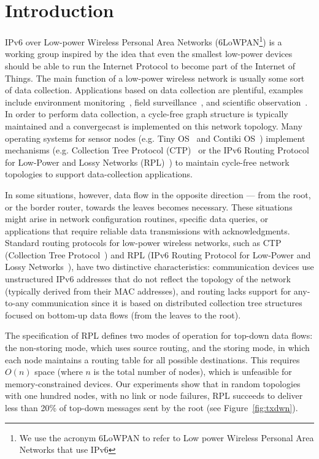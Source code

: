 \section{Introduction}

IPv6 over Low-power Wireless Personal Area Networks (6LoWPAN\footnote{We use the acronym 6LoWPAN to refer to Low power Wireless Personal Area Networks that use IPv6}) is a working group inspired by the idea that even the smallest low-power devices should be able to run the Internet Protocol to become part of the Internet of Things. The main function of a low-power wireless network is usually some sort of data collection. Applications based on data collection are plentiful, examples include environment monitoring~\cite{Tolle:2005}, field surveillance~\cite{Vicaire:2009}, and scientific observation~\cite{Werner-Allen:2006}. In order to perform data collection, a cycle-free graph structure is typically maintained and a convergecast is implemented on this network topology. Many operating systems for sensor nodes (e.g. Tiny OS~\cite{Levis2005} and Contiki OS~\cite{Dunkels:2004}) implement mechanisms (e.g. Collection Tree Protocol (CTP)~\cite{Fonseca:2009} or the IPv6 Routing Protocol for Low-Power and Lossy Networks (RPL)~\cite{rfc6550}) to maintain cycle-free network topologies to support data-collection applications.

In some situations, however, data flow in the opposite direction --- from the root, or the border router, towards the leaves becomes necessary. These situations might arise in network configuration routines, specific data queries, or applications that require reliable data transmissions with acknowledgments. Standard routing protocols for low-power wireless networks, such as CTP (Collection Tree Protocol~\cite{Fonseca:2009}) and RPL (IPv6 Routing Protocol for Low-Power and Lossy Networks~\cite{rfc6550}), have two distinctive characteristics: communication devices use unstructured IPv6 addresses that do not reflect the topology of the network (typically derived from their MAC addresses), and routing lacks support for any-to-any communication since it is based on distributed collection tree structures focused on bottom-up data flows (from the leaves to the root).

 The specification of RPL defines two modes of operation for top-down data flows: the non-storing mode, which uses source routing, and the storing mode, in which each node maintains a routing table for all possible destinations. This requires $O(n)$ space (where $n$ is the total number of nodes), which is unfeasible for memory-constrained devices. Our experiments show that in random topologies with one hundred nodes, with no link or node failures, RPL succeeds to deliver less than 20\% of top-down messages sent by the root (see Figure~\ref{fig:txdwn}).


